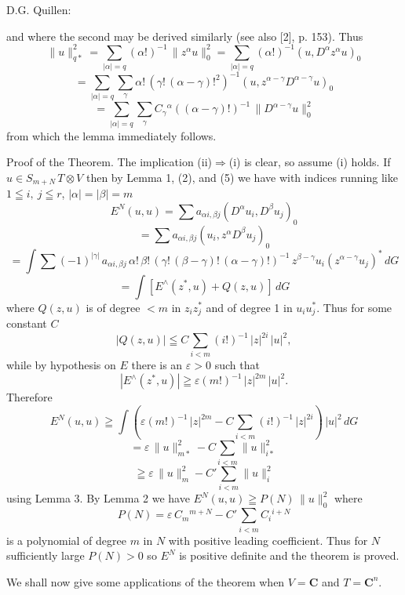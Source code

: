  D.G. Quillen:

and where the second may be derived similarly (see also [2], p. 153). Thus
\[ \|u\|^2_{q*} = \sum_{|\alpha|=q} (\alpha!)^{-1}\, \|z^\alpha u\|^2_0 = \sum_{|\alpha|=q} (\alpha!)^{-1} (u, D^\alpha z^\alpha u)_0 \]
\[ = \sum_{|\alpha|=q} \sum_{\gamma} \alpha!\,(\gamma!\,(\alpha-\gamma)!^2)^{-1} (u, z^{\alpha-\gamma} D^{\alpha-\gamma} u)_0 \]
\[ = \sum_{|\alpha|=q} \sum_{\gamma} C_\gamma{}^\alpha ((\alpha-\gamma)!)^{-1}\, \|D^{\alpha-\gamma} u\|^2_0 \]
from which the lemma immediately follows.

Proof of the Theorem. The implication (ii)$\Rightarrow$(i) is clear, so assume (i)
holds. If $u \in S_{m+N}\, T \otimes V$ then by Lemma 1, (2), and (5) we have with
indices running like $1 \leqq i,\ j \leqq r$, $|\alpha| = |\beta| = m$
\[ E^N(u,u) = \sum a_{\alpha i, \beta j} (D^\alpha u_i, D^\beta u_j)_0 \]
\[ = \sum a_{\alpha i, \beta j} (u_i, z^\alpha D^\beta u_j)_0 \]
\[ = \int \sum (-1)^{|\gamma|}\, a_{\alpha i, \beta j}\, \alpha!\, \beta!\, (\gamma!\, (\beta-\gamma)!\, (\alpha-\gamma)!)^{-1}\, z^{\beta-\gamma} u_i (z^{\alpha-\gamma} u_j)^*\, dG \]
\[ = \int [E^\wedge (z^*, u) + Q(z,u)]\, dG \]
where $Q(z,u)$ is of degree $<m$ in $z_i z_j^*$ and of degree 1 in $u_i u_j^*$. Thus
for some constant $C$
\[ |Q(z,u)| \leqq C \sum_{i<m} (i!)^{-1}\, |z|^{2i}\, |u|^2, \]
while by hypothesis on $E$ there is an $\varepsilon > 0$ such that
\[ |E^\wedge (z^*, u)| \geqq \varepsilon (m!)^{-1}\, |z|^{2m}\, |u|^2. \]
Therefore
\[ E^N(u,u) \geqq \int (\varepsilon (m!)^{-1}\, |z|^{2m} - C \sum_{i<m} (i!)^{-1}\, |z|^{2i})\, |u|^2\, dG \]
\[ = \varepsilon\, \|u\|^2_{m*} - C \sum_{i<m} \|u\|^2_{i*} \]
\[ \geqq \varepsilon\, \|u\|^2_m - C' \sum_{i<m} \|u\|^2_i \]
using Lemma 3. By Lemma 2 we have $E^N(u,u) \geqq P(N)\, \|u\|^2_0$ where
\[ P(N) = \varepsilon\, C_m{}^{m+N} - C' \sum_{i<m} C_i{}^{i+N} \]
is a polynomial of degree $m$ in $N$ with positive leading coefficient. Thus
for $N$ sufficiently large $P(N) > 0$ so $E^N$ is positive definite and the theorem
is proved.

We shall now give some applications of the theorem when $V = \mathbf{C}$
\margin{\unsure{$\backslash$}} and $T = \mathbf{C}^n$.

